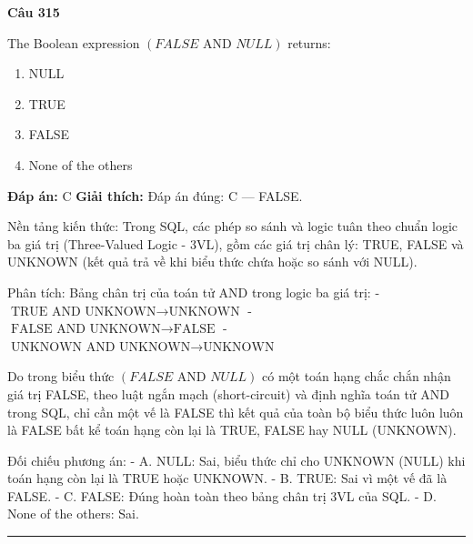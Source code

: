 \documentclass[11pt,a4paper]{article}
\newenvironment{question}[1]{%
  \par\vspace{1em}\noindent\textbf{\large Câu #1}\par\vspace{0.4em}
}{%
  \par\vspace{1em}\hrule\vspace{0.6em}
}
\newenvironment{choices}{%
  \begin{enumerate}[label=\textbf{\Alph*.},leftmargin=2.2em,itemsep=2pt,topsep=3pt]
}{%
  \end{enumerate}
}
\newcommand{\choice}{\item}
\begin{document}
\begin{question}{315}
The Boolean expression \((FALSE \text{ AND } NULL)\) returns:
\begin{choices}
\choice NULL
\choice TRUE
\choice FALSE
\choice None of the others
\end{choices}
\textbf{Đáp án:} C
\textbf{Giải thích:} Đáp án đúng: C — FALSE.

Nền tảng kiến thức: Trong SQL, các phép so sánh và logic tuân theo chuẩn logic ba giá trị (Three-Valued Logic - 3VL), gồm các giá trị chân lý: TRUE, FALSE và UNKNOWN (kết quả trả về khi biểu thức chứa hoặc so sánh với NULL).

Phân tích: 
Bảng chân trị của toán tử AND trong logic ba giá trị:
- $\text{TRUE AND UNKNOWN} \rightarrow \text{UNKNOWN}$
- $\text{FALSE AND UNKNOWN} \rightarrow \text{FALSE}$
- $\text{UNKNOWN AND UNKNOWN} \rightarrow \text{UNKNOWN}$

Do trong biểu thức \((FALSE \text{ AND } NULL)\) có một toán hạng chắc chắn nhận giá trị FALSE, theo luật ngắn mạch (short-circuit) và định nghĩa toán tử AND trong SQL, chỉ cần một vế là FALSE thì kết quả của toàn bộ biểu thức luôn luôn là FALSE bất kể toán hạng còn lại là TRUE, FALSE hay NULL (UNKNOWN).

Đối chiếu phương án:
- A. NULL: Sai, biểu thức chỉ cho UNKNOWN (NULL) khi toán hạng còn lại là TRUE hoặc UNKNOWN.
- B. TRUE: Sai vì một vế đã là FALSE.
- C. FALSE: Đúng hoàn toàn theo bảng chân trị 3VL của SQL.
- D. None of the others: Sai.
\end{question}
\end{document}
